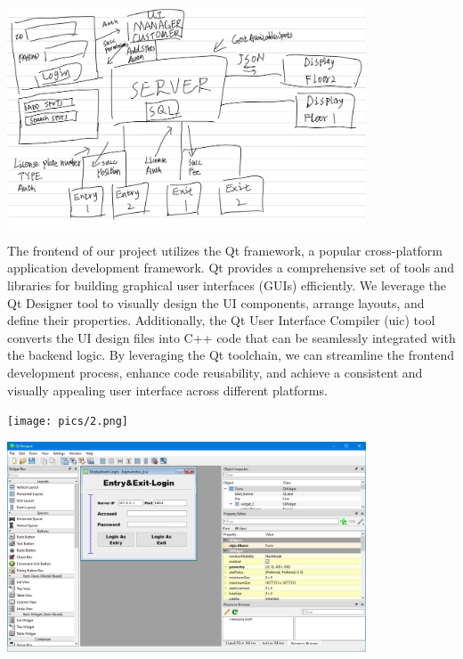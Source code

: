 {\begin{center}
  \centering
  \includegraphics[width=0.8\textwidth]{pics/1.png}
\end{center}


The frontend of our project utilizes the Qt framework, a popular
cross-platform application development framework. Qt provides a
comprehensive set of tools and libraries for building graphical user
interfaces (GUIs) efficiently. We leverage the Qt Designer tool to
visually design the UI components, arrange layouts, and define their
properties. Additionally, the Qt User Interface Compiler (uic) tool
converts the UI design files into C++ code that can be seamlessly
integrated with the backend logic. By leveraging the Qt toolchain, we
can streamline the frontend development process, enhance code
reusability, and achieve a consistent and visually appealing user
interface across different platforms.

\begin{center}
  \centering
  \texttt{[image: pics/2.png]}
\end{center}

\begin{center}
  \centering
  \includegraphics[width=0.8\textwidth]{pics/3.png}
\end{center}

}
